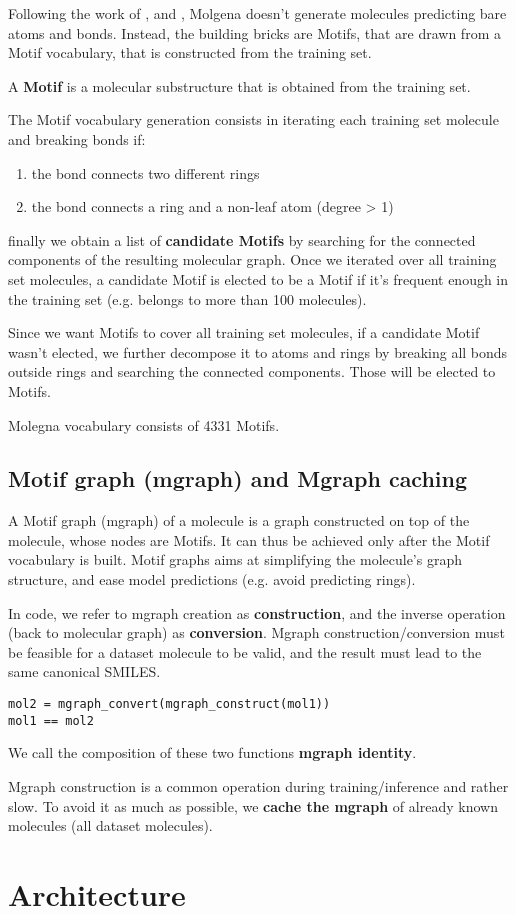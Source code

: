 \documentclass{article}
\begin{document}
Following the work of \cite{jtvae2019}, \cite{hievae2020} and \cite{microsoft2024}, Molgena doesn't generate molecules
predicting bare atoms and bonds. Instead, the building bricks are Motifs, that are drawn from a Motif vocabulary, that is
constructed from the training set.

A \textbf{Motif} is a molecular substructure that is obtained from the training set.

The Motif vocabulary generation consists in iterating each training set molecule and breaking bonds if:
\begin{enumerate}
\item the bond connects two different rings
\item the bond connects a ring and a non-leaf atom (degree > 1)
\end{enumerate}
finally we obtain a list of \textbf{candidate Motifs} by searching for the connected components of the resulting molecular graph.
Once we iterated over all training set molecules, a candidate Motif is elected to be a Motif if it's frequent enough in
the training set (e.g. belongs to more than 100 molecules).

Since we want Motifs to cover all training set molecules, if a candidate Motif wasn't elected, we further decompose
it to atoms and rings by breaking all bonds outside rings and searching the connected components. Those will be elected to
Motifs.

Molegna vocabulary consists of 4331 Motifs.

\subsection{Motif graph (mgraph) and Mgraph caching}

A Motif graph (mgraph) of a molecule is a graph constructed on top of the molecule, whose nodes are Motifs.
It can thus be achieved only after the Motif vocabulary is built.
Motif graphs aims at simplifying the molecule's graph structure, and ease model predictions (e.g. avoid predicting rings).

In code, we refer to mgraph creation as \textbf{construction}, and the inverse operation (back to molecular graph) as \textbf{conversion}.
Mgraph construction/conversion must be feasible for a dataset molecule to be valid, and the result must lead to the same canonical SMILES.

\begin{lstlisting}[linewidth=\linewidth]
mol2 = mgraph_convert(mgraph_construct(mol1))
mol1 == mol2
\end{lstlisting}

We call the composition of these two functions \textbf{mgraph identity}.

Mgraph construction is a common operation during training/inference and rather slow.
To avoid it as much as possible, we \textbf{cache the mgraph} of already known molecules (all dataset molecules).

\section{Architecture}
\end{document}
